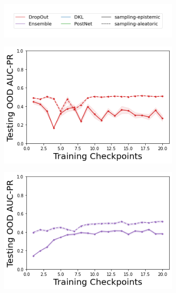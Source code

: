 \begin{figure}
    \centering
        \vspace{-3mm}
    \begin{subfigure}{.45\textwidth}
        \includegraphics[width=\textwidth]{sections/011_icml2022/resources/sampling-legend.png}
    \end{subfigure}
    \vspace{-3mm}
    
    \begin{subfigure}{.24\textwidth}
        \includegraphics[width=\textwidth]{sections/011_icml2022/resources/DropOut-AcrobotOOD-v0-AUC-PR-out-epistemic_-testing-strategy.png}
    \end{subfigure}
    \begin{subfigure}{.24\textwidth}
        \includegraphics[width=\textwidth]{sections/011_icml2022/resources/Ensemble-AcrobotOOD-v0-AUC-PR-out-epistemic_-testing-strategy.png}

\end{subfigure}
\end{figure}
